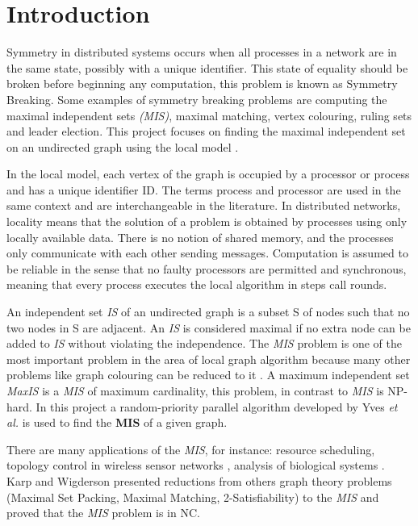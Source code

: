 \section{Introduction}
\label{cap:1}

Symmetry in distributed systems occurs when all processes in a network are in the same state, possibly with a unique identifier. This state of equality should be broken before beginning any computation, this problem is known as Symmetry Breaking. Some examples of symmetry breaking problems are computing the maximal independent sets \textit{(MIS)}, maximal matching, vertex colouring, ruling sets and leader election. This project focuses on finding the maximal independent set on an undirected graph using the local model \cite{linial1992locality}.

In the local model, each vertex of the graph is occupied by a processor or process and has a unique identifier ID. The terms process and processor are used in the same context and are interchangeable in the literature. In distributed networks, locality means that the solution of a problem is obtained by processes using only locally available data. There is no notion of shared memory, and the processes only communicate with each other sending messages. Computation is assumed to be reliable in the sense that no faulty processors are permitted and synchronous, meaning that every process executes the local algorithm in steps call rounds.  

An independent set \textit{IS} of an undirected graph is a subset S of nodes such that no two nodes in S are adjacent. An \textit{IS} is considered maximal if no extra node can be added to \textit{IS} without violating the independence. The \textit{MIS} problem is one of the most important problem in the area of local graph algorithm because many other problems like graph colouring can be reduced to it \cite{panconesi1992improved}. A maximum independent set \textit{MaxIS} is a \textit{MIS} of maximum cardinality, this problem, in contrast to \textit{MIS} is NP-hard. In this project a random-priority parallel algorithm developed by Yves \textit{et al.} \cite{yves2009optimal} is used to find the \textbf{MIS} of a given graph.

There are many applications of the \textit{MIS}, for instance: resource scheduling, topology control in wireless sensor networks \cite{basagni2001finding}, analysis of biological systems \cite{afek2013beeping}. Karp and Wigderson \cite{karp1986constructing} presented reductions from \newline others graph theory problems (Maximal Set Packing, Maximal Matching, 2-Satisfiability) to the \textit{MIS} and proved that the \textit{MIS} problem is in NC.

